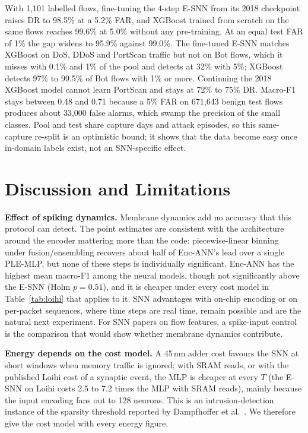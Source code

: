 \documentclass[conference]{IEEEtran}
\begin{document}
With 1{,}101 labelled flows, fine-tuning the 4-step E-SNN from its 2018 checkpoint raises DR to 98.5\% at a 5.2\% FAR, and XGBoost trained from scratch on the same flows reaches 99.6\% at 5.0\% without any pre-training. At an equal test FAR of 1\% the gap widens to 95.9\% against 99.0\%. The fine-tuned E-SNN matches XGBoost on DoS, DDoS and PortScan traffic but not on Bot flows, which it misses with 0.1\% and 1\% of the pool and detects at 32\% with 5\%; XGBoost detects 97\% to 99.5\% of Bot flows with 1\% or more. Continuing the 2018 XGBoost model cannot learn PortScan and stays at 72\% to 75\% DR. Macro-F1 stays between 0.48 and 0.71 because a 5\% FAR on 671{,}643 benign test flows produces about 33{,}000 false alarms, which swamp the precision of the small classes. Pool and test share capture days and attack episodes, so this same-capture re-split is an optimistic bound; it shows that the data become easy once in-domain labels exist, not an SNN-specific effect.

\section{Discussion and Limitations}

\textbf{Effect of spiking dynamics.} Membrane dynamics add no accuracy that this protocol can detect. The point estimates are consistent with the architecture around the encoder mattering more than the code: piecewise-linear binning~\cite{gorishniy2022} under fusion/ensembling recovers about half of Enc-ANN's lead over a single PLE-MLP, but none of these steps is individually significant. Enc-ANN has the highest mean macro-F1 among the neural models, though not significantly above the E-SNN (Holm $p = 0.51$), and it is cheaper under every cost model in Table~\ref{tab:loihi} that applies to it. SNN advantages with on-chip encoding or on per-packet sequences, where time steps are real time, remain possible and are the natural next experiment. For SNN papers on flow features, a spike-input control is the comparison that would show whether membrane dynamics contribute.

\textbf{Energy depends on the cost model.} A 45\,nm adder cost favours the SNN at short windows when memory traffic is ignored; with SRAM reads, or with the published Loihi cost of a synaptic event, the MLP is cheaper at every $T$ (the E-SNN on Loihi costs 2.5 to 7.2 times the MLP with SRAM reads), mainly because the input encoding fans out to 128 neurons. This is an intrusion-detection instance of the sparsity threshold reported by Dampfhoffer et al.~\cite{dampfhoffer2023}. We therefore give the cost model with every energy figure.
\end{document}
